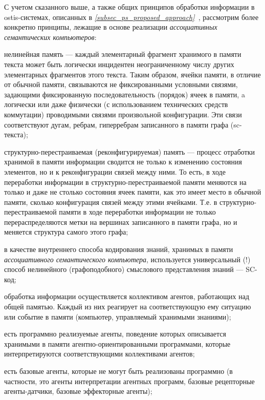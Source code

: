 С учетом сказанного выше, а также общих принципов обработки информации в ostis-системах, описанных в \textit{\ref{subsec_ps_proposed_approach}~}, рассмотрим более конкретно принципы, лежащие в основе реализации \textit{ассоциативных семантических компьютеров}:
\begin{textitemize}
	\item нелинейная память --- каждый элементарный фрагмент хранимого в памяти текста может быть логически инцидентен неограниченному числу других элементарных фрагментов этого текста. Таким образом, ячейки памяти, в отличие от обычной памяти, связываются не фиксированными условными связями, задающими фиксированную последовательность (порядок) ячеек в памяти, a логически или даже физически (с использованием технических средств коммутации) проводимыми связями произвольной конфигурации. Эти связи соответствуют дугам, ребрам, гиперребрам записанного в памяти графа (sc-текста);
	\item структурно-перестраиваемая (реконфигурируемая) память --- процесс отработки хранимой в памяти информации сводится не только к изменению состояния элементов, но и к реконфигурации связей между ними. То есть, в ходе переработки информации в структурно-перестраиваемой памяти меняются на только и даже не столько состояния ячеек памяти, как это имеет место в обычной памяти, сколько конфигурация связей между этими ячейками. Т.е. в структурно-перестраиваемой памяти в ходе переработки информации не только перераспределяются метки на вершинах записанного в памяти графа, но и меняется структура самого этого графа;	
	\item в качестве внутреннего способа кодирования знаний, хранимых в памяти \textit{ассоциативного семантического компьютера}, используется универсальный (!) способ нелинейного (графоподобного) смыслового представления знаний --- SC-код;
	\item обработка информации осуществляется коллективом агентов, работающих над общей памятью. Каждый из них реагирует на соответствующую ему ситуацию или событие в памяти (компьютер, управляемый хранимыми знаниями);
	\item есть программно реализуемые агенты, поведение которых описывается хранимыми в памяти агентно-ориентированными программами, которые интерпретируются соответствующими коллективами агентов;
	\item есть базовые агенты, которые не могут быть реализованы программно (в частности, это агенты интерпретации агентных программ, базовые рецепторные агенты-датчики, базовые эффекторные агенты);

\end{textitemize}
